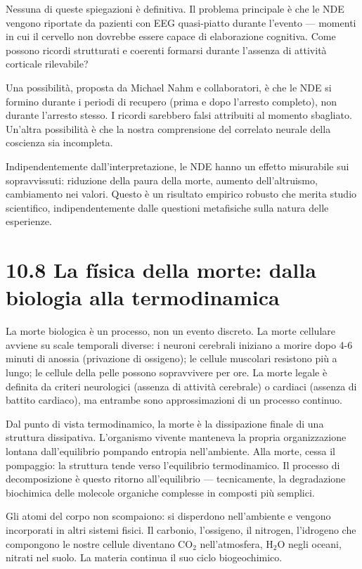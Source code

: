 \documentclass[11.5pt,a4paper,openany]{book}
\theoremstyle{remark}
\begin{document}
Nessuna di queste spiegazioni è definitiva. Il problema principale è che le NDE vengono riportate da pazienti con EEG quasi-piatto durante l'evento --- momenti in cui il cervello non dovrebbe essere capace di elaborazione cognitiva. Come possono ricordi strutturati e coerenti formarsi durante l'assenza di attività corticale rilevabile?

Una possibilità, proposta da Michael Nahm e collaboratori, è che le NDE si formino durante i periodi di recupero (prima e dopo l'arresto completo), non durante l'arresto stesso. I ricordi sarebbero falsi attribuiti al momento sbagliato. Un'altra possibilità è che la nostra comprensione del correlato neurale della coscienza sia incompleta.

Indipendentemente dall'interpretazione, le NDE hanno un effetto misurabile sui sopravvissuti: riduzione della paura della morte, aumento dell'altruismo, cambiamento nei valori. Questo è un risultato empirico robusto che merita studio scientifico, indipendentemente dalle questioni metafisiche sulla natura delle esperienze.

\section{10.8 La física della morte: dalla biologia alla termodinamica}

La morte biologica è un processo, non un evento discreto. La morte cellulare avviene su scale temporali diverse: i neuroni cerebrali iniziano a morire dopo 4-6 minuti di anossia (privazione di ossigeno); le cellule muscolari resistono più a lungo; le cellule della pelle possono sopravvivere per ore. La morte legale è definita da criteri neurologici (assenza di attività cerebrale) o cardiaci (assenza di battito cardiaco), ma entrambe sono approssimazioni di un processo continuo.

Dal punto di vista termodinamico, la morte è la dissipazione finale di una struttura dissipativa. L'organismo vivente manteneva la propria organizzazione lontana dall'equilibrio pompando entropia nell'ambiente. Alla morte, cessa il pompaggio: la struttura tende verso l'equilibrio termodinamico. Il processo di decomposizione è questo ritorno all'equilibrio --- tecnicamente, la degradazione biochimica delle molecole organiche complesse in composti più semplici.

Gli atomi del corpo non scompaiono: si disperdono nell'ambiente e vengono incorporati in altri sistemi fisici. Il carbonio, l'ossigeno, il nitrogen, l'idrogeno che compongono le nostre cellule diventano CO$_2$ nell'atmosfera, H$_2$O negli oceani, nitrati nel suolo. La materia continua il suo ciclo biogeochimico.
\end{document}
